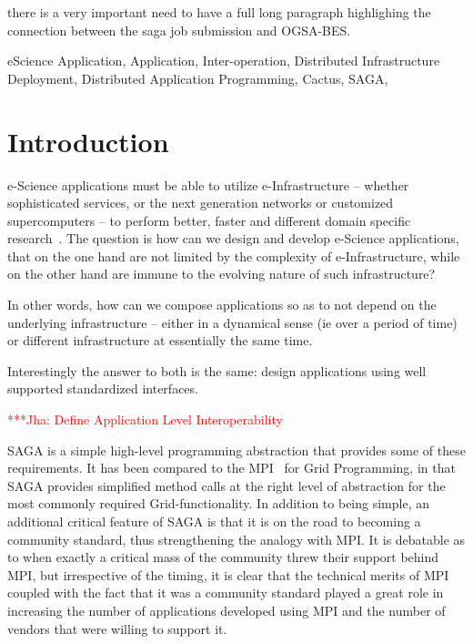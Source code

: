 \documentclass[conference,final]{IEEEtran}
\newcommand{\andre}[0]{}
\newcommand{\jhanote}[1]{ {\textcolor{red} { ***Jha: #1 }}}
\begin{document}
\andre{there is a very important need to have a full long paragraph 
highlighing the connection between the saga job submission and
OGSA-BES.

\begin{keywords}
  eScience Application, Application, Inter-operation, Distributed
  Infrastructure Deployment, Distributed Application Programming,
  Cactus, SAGA,
\end{keywords}

\section{Introduction}

e-Science applications must be able to utilize e-Infrastructure --
whether sophisticated services, or the next generation networks or
customized supercomputers -- to perform better, faster and different
domain specific research~\cite{hey04, hey05}.  The question is how can
we design and develop e-Science applications, that on the one hand are
not limited by the complexity of e-Infrastructure, while on the other
hand are immune to the evolving nature of such infrastructure? 

In other words, how can we compose applications so as to not depend on
the underlying infrastructure -- either in a dynamical sense (ie over
a period of time) or different infrastructure at essentially the same
time.

Interestingly the answer to both is the same: design applications
using well supported standardized interfaces.

\jhanote{Define Application Level Interoperability}

SAGA is a simple high-level programming abstraction that provides some
of these requirements.  It has been compared to the
MPI~\cite{mpiforum_url} for Grid Programming, in that SAGA provides
simplified method calls at the right level of abstraction for the most
commonly required Grid-functionality.  In addition to being simple, an
additional critical feature of SAGA is that it is on the road to
becoming a community standard, thus strengthening the analogy with
MPI.  It is debatable as to when exactly a critical mass of the
community threw their support behind MPI, but irrespective of the
timing, it is clear that the technical merits of MPI coupled with the
fact that it was a community standard played a great role in
increasing the number of applications developed using MPI and the
number of vendors that were willing to support it.

}
\end{document}
